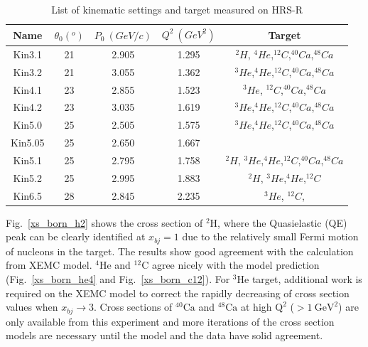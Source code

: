 \begin{table}[!ht]
  \centering
  \begin{tabular}{|c|c|c|c|c|}
    \hline
    Name      &  $\theta_{0} (^{o})$    & $P_{0}~(GeV/c)$ & $Q^{2}~(GeV^{2})$ &  Target \\
    \hline 
     Kin3.1   &21     & 2.905           & 1.295   & $^{2}H$,          $^{4}He$,$^{12}C$,$^{40}Ca$,$^{48}Ca$ \\
    \hline                      
     Kin3.2   &21     & 3.055           & 1.362   &          $^{3}He$,$^{4}He$,$^{12}C$,$^{40}Ca$,$^{48}Ca$ \\
     \hline 
     Kin4.1   &23     & 2.855           & 1.523   &          $^{3}He$,         $^{12}C$,$^{40}Ca$,$^{48}Ca$ \\
      \hline 
     Kin4.2   &23     & 3.035           & 1.619   &          $^{3}He$,$^{4}He$,$^{12}C$,$^{40}Ca$,$^{48}Ca$ \\
     \hline 
     Kin5.0   &25     & 2.505           & 1.575   &          $^{3}He$,$^{4}He$,$^{12}C$,$^{40}Ca$,$^{48}Ca$ \\
     \hline 
     Kin5.05  &25     & 2.650           & 1.667   &                                                         \\
     \hline    
     Kin5.1   &25     & 2.795           & 1.758   & $^{2}H$, $^{3}He$,$^{4}He$,$^{12}C$,$^{40}Ca$,$^{48}Ca$ \\
     \hline    
     Kin5.2   &25     & 2.995           & 1.883   & $^{2}H$, $^{3}He$,$^{4}He$,$^{12}C$                     \\
    \hline 
     Kin6.5   &28                       & 2.845           & 2.235   &          $^{3}He$,        $^{12}C$,                    \\    
    \hline 
   \end{tabular}
  \caption[List of kinematic settings and target measured on HRS-R]{List of kinematic settings and target measured on HRS-R}
  \label{kine_table_right}	
\end{table}
  
 Fig.~\ref{xs_born_h2} shows the cross section of $\mathrm{^{2}H}$, where the Quasielastic (QE) peak can be clearly identified at $x_{bj}=1$ due to the relatively small Fermi motion of nucleons in the target. The results show good agreement with the calculation from XEMC model. $\mathrm{^{4}He}$ and $\mathrm{^{12}C}$ agree nicely with the model prediction (Fig.~\ref{xs_born_he4} and Fig.~\ref{xs_born_c12}). For $\mathrm{^{3}He}$ target, additional work is required on the XEMC model to correct the rapidly decreasing of cross section values when $x_{bj}\rightarrow 3$. Cross sections of $\mathrm{^{40}Ca}$ and $\mathrm{^{48}Ca}$ at high $\mathrm{Q^{2}}$ ($\mathrm{>1~GeV^{2}}$) are only available from this experiment and more iterations of the cross section models are necessary until the model and the data have solid agreement.
 

